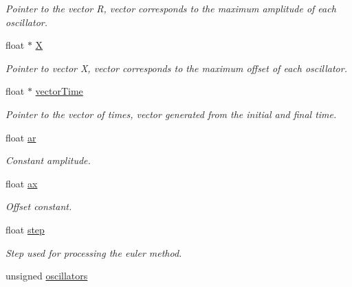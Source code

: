 \begin{DoxyCompactItemize}
\begin{DoxyCompactList}\small\item\em Pointer to the vector R, vector corresponds to the maximum amplitude of each oscillator. \end{DoxyCompactList}\item 
float $\ast$ \hyperlink{classCpg_ab5e9ed03a3c2922f1bb1686e4564828c}{X}\hypertarget{classCpg_ab5e9ed03a3c2922f1bb1686e4564828c}{}\label{classCpg_ab5e9ed03a3c2922f1bb1686e4564828c}

\begin{DoxyCompactList}\small\item\em Pointer to vector X, vector corresponds to the maximum offset of each oscillator. \end{DoxyCompactList}\item 
float $\ast$ \hyperlink{classCpg_a039cbe2ebef83e1209f360d4bb30692a}{vector\+Time}\hypertarget{classCpg_a039cbe2ebef83e1209f360d4bb30692a}{}\label{classCpg_a039cbe2ebef83e1209f360d4bb30692a}

\begin{DoxyCompactList}\small\item\em Pointer to the vector of times, vector generated from the initial and final time. \end{DoxyCompactList}\item 
float \hyperlink{classCpg_af76aac2e1a75360d0dafdad4b1962c0b}{ar}\hypertarget{classCpg_af76aac2e1a75360d0dafdad4b1962c0b}{}\label{classCpg_af76aac2e1a75360d0dafdad4b1962c0b}

\begin{DoxyCompactList}\small\item\em Constant amplitude. \end{DoxyCompactList}\item 
float \hyperlink{classCpg_af68418337b76130697175d74ee188dfe}{ax}\hypertarget{classCpg_af68418337b76130697175d74ee188dfe}{}\label{classCpg_af68418337b76130697175d74ee188dfe}

\begin{DoxyCompactList}\small\item\em Offset constant. \end{DoxyCompactList}\item 
float \hyperlink{classCpg_ac401bdb453b48eb16f139c85cf84c50e}{step}\hypertarget{classCpg_ac401bdb453b48eb16f139c85cf84c50e}{}\label{classCpg_ac401bdb453b48eb16f139c85cf84c50e}

\begin{DoxyCompactList}\small\item\em Step used for processing the euler method. \end{DoxyCompactList}\item 
unsigned \hyperlink{classCpg_a76df223d02d7b73195e9bbf899c18efb}{oscillators}\hypertarget{classCpg_a76df223d02d7b73195e9bbf899c18efb}{}\label{classCpg_a76df223d02d7b73195e9bbf899c18efb}


\end{DoxyCompactItemize}

